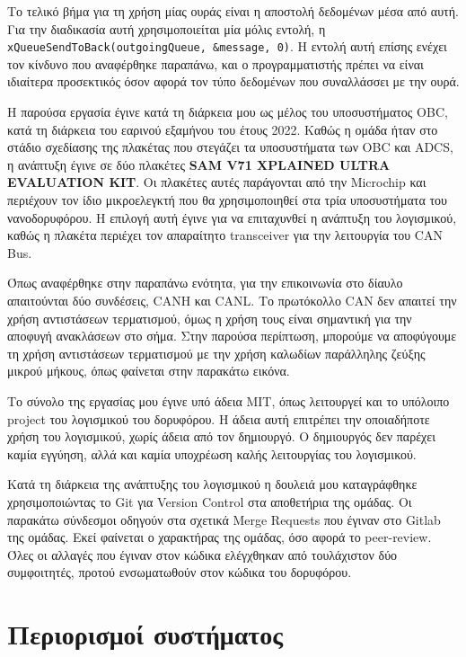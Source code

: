\documentclass[a4paper,nobib,justified]{tufte-book}
\begin{document}
Το τελικό βήμα για τη χρήση μίας ουράς είναι η αποστολή δεδομένων μέσα από αυτή. Για την διαδικασία αυτή χρησιμοποιείται μία μόλις εντολή, η \texttt{xQueueSendToBack(outgoingQueue, \&message, 0)}. Η εντολή αυτή επίσης ενέχει τον κίνδυνο που αναφέρθηκε παραπάνω, και ο προγραμματιστής πρέπει να είναι ιδιαίτερα προσεκτικός όσον αφορά τον τύπο δεδομένων που συναλλάσσει με την ουρά. 

Η παρούσα εργασία έγινε κατά τη διάρκεια μου ως μέλος του υποσυστήματος OBC, κατά τη διάρκεια του εαρινού εξαμήνου του έτους 2022. Καθώς η ομάδα ήταν στο στάδιο σχεδίασης της πλακέτας που στεγάζει τα υποσυστήματα των OBC και ADCS, η ανάπτυξη έγινε σε δύο πλακέτες \textbf{SAM V71 XPLAINED ULTRA EVALUATION KIT}. Οι πλακέτες αυτές παράγονται από την Microchip και περιέχουν τον ίδιο μικροελεγκτή που θα χρησιμοποιηθεί στα τρία υποσυστήματα του νανοδορυφόρου. Η επιλογή αυτή έγινε για να επιταχυνθεί η ανάπτυξη του λογισμικού, καθώς η πλακέτα περιέχει τον απαραίτητο transceiver για την λειτουργία του CAN Bus. 

Όπως αναφέρθηκε στην παραπάνω ενότητα, για την επικοινωνία στο δίαυλο απαιτούνται δύο συνδέσεις, CANH και CANL. Το πρωτόκολλο CAN δεν απαιτεί την χρήση αντιστάσεων τερματισμού, όμως η χρήση τους είναι σημαντική για την αποφυγή ανακλάσεων στο σήμα. Στην παρούσα περίπτωση, μπορούμε να αποφύγουμε τη χρήση αντιστάσεων τερματισμού με την χρήση καλωδίων παράλληλης ζεύξης μικρού μήκους, όπως φαίνεται στην παρακάτω εικόνα.

Το σύνολο της εργασίας μου έγινε υπό άδεια MIT, όπως λειτουργεί και το υπόλοιπο project του λογισμικού του δορυφόρου. Η άδεια αυτή επιτρέπει την οποιαδήποτε χρήση του λογισμικού, χωρίς άδεια από τον δημιουργό. Ο δημιουργός δεν παρέχει καμία εγγύηση, αλλά και καμία υποχρέωση καλής λειτουργίας του λογισμικού. 

Κατά τη διάρκεια της ανάπτυξης του λογισμικού η δουλειά μου καταγράφθηκε χρησιμοποιώντας το Git για Version Control στα αποθετήρια της ομάδας. Οι παρακάτω σύνδεσμοι οδηγούν στα σχετικά Merge Requests που έγιναν στο Gitlab της ομάδας. Εκεί φαίνεται ο χαρακτήρας της ομάδας, όσο αφορά το peer-review. Όλες οι αλλαγές που έγιναν στον κώδικα ελέγχθηκαν από τουλάχιστον δύο συμφοιτητές, προτού ενσωματωθούν στον κώδικα του δορυφόρου. 

\section{Περιορισμοί συστήματος}
\end{document}
